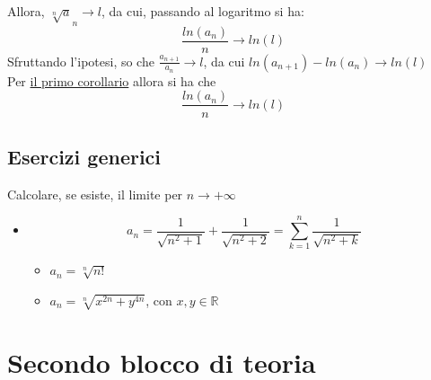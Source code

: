 \documentclass{article}
\theoremstyle{definition}
\begin{document}
Allora, $\sqrt[n]a_n \longrightarrow l$, da cui, passando al logaritmo si ha:
\begin{equation}
    \frac{ln(a_n)}{n} \longrightarrow ln(l)
\end{equation}
Sfruttando l'ipotesi, so che $\frac{a_{n+1}}{a_n} \longrightarrow l$, da cui $ln(a_{n+1})-ln(a_n) \longrightarrow ln(l)$
\\
Per \underline{il primo corollario} allora si ha che
\begin{equation}
    \frac{ln(a_n)}{n} \longrightarrow ln(l)
\end{equation}

\subsection{Esercizi generici}
Calcolare, se esiste, il limite per $n \to +\infty$
\begin{itemize}
    \item 
    \begin{equation}
        a_n=\frac{1}{\sqrt{n^2+1}}+\frac{1}{\sqrt{n^2+2}}=\sum_{k=1}^n\frac{1}{\sqrt{n^2+k}}
    \end{equation}
    \begin{itemize}
        \item $a_n=\sqrt[n]{n!}$
        \item $a_n=\sqrt[n]{x^{2n}+y^{4n}}$, con $x,y \in \mathbb{R}$
    \end{itemize}
\end{itemize}
\newpage
\section{Secondo blocco di teoria}
\end{document}
